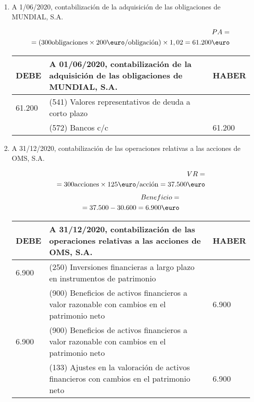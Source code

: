 \begin{enumerate}[label=\alph*)]
    \item A 1/06/2020, contabilización de la adquisición de las obligaciones de MUNDIAL, S.A.
    
    \begin{align*}
        PA = \\ 
        = (300 \text{obligaciones} \times 200 \text{\euro/obligación}) \times 1,02 = 61.200 \text{\euro}
    \end{align*}
    \begin{table}[H]
        \centering
        \begin{tabular}{|p{3cm}|p{6cm}|p{3cm}|}
        \hline
        \rowcolor{blue!30}
        \textbf{DEBE} & \textbf{A 01/06/2020, contabilización de la adquisición de las obligaciones de MUNDIAL, S.A.} & \textbf{HABER} \\
        \hline
        61.200 & (541) Valores representativos de deuda a corto plazo & \\
        \hline
        & (572) Bancos c/c & 61.200 \\
        \hline
        \end{tabular}
    \end{table}
    \item A 31/12/2020, contabilización de las operaciones relativas a las acciones de OMS, S.A.
    
    \begin{align*}
        VR = \\ 
        = 300 \text{acciones} \times 125 \text{\euro/acción} = 37.500 \text{\euro}
    \end{align*}
    \begin{align*}
        Beneficio = \\ 
        = 37.500 - 30.600 = 6.900 \text{\euro}
    \end{align*}

    \begin{table}[H]
        \centering
        \begin{tabular}{|p{3cm}|p{6cm}|p{3cm}|}
        \hline
        \rowcolor{blue!30}
        \textbf{DEBE} & \textbf{A 31/12/2020, contabilización de las operaciones relativas a las acciones de OMS, S.A.} & \textbf{HABER} \\
        \hline
        6.900 & (250) Inversiones financieras a largo plazo en instrumentos de patrimonio & \\
        \hline
        & (900) Beneficios de activos financieros a valor razonable con cambios en el patrimonio neto & 6.900 \\
        \hline
        6.900 & (900) Beneficios de activos financieros a valor razonable con cambios en el patrimonio neto & \\
        \hline
        & (133) Ajustes en la valoración de activos financieros con cambios en el patrimonio neto & 6.900 \\
        \hline
        \end{tabular}
    \end{table}


\end{enumerate}
